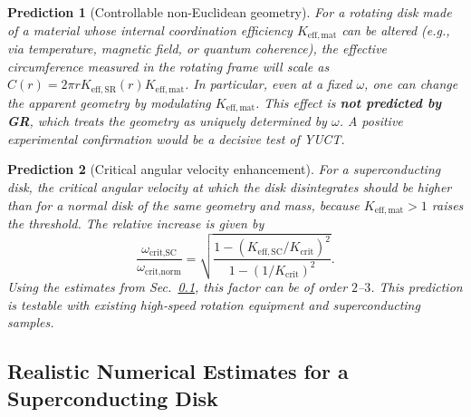 \documentclass[12pt,a4paper]{article}
\newtheorem{prediction}{Prediction}[section]
\begin{document}
	\begin{prediction}[Controllable non-Euclidean geometry]
		For a rotating disk made of a material whose internal coordination efficiency \(K_{\mathrm{eff,mat}}\) can be altered (e.g., via temperature, magnetic field, or quantum coherence), the effective circumference measured in the rotating frame will scale as \(C(r) = 2\pi r K_{\mathrm{eff,SR}}(r) K_{\mathrm{eff,mat}}\). In particular, even at a fixed \(\omega\), one can change the apparent geometry by modulating \(K_{\mathrm{eff,mat}}\). This effect is \textbf{not predicted by GR}, which treats the geometry as uniquely determined by \(\omega\). A positive experimental confirmation would be a decisive test of YUCT.
	\end{prediction}
	
	\begin{prediction}[Critical angular velocity enhancement]
		For a superconducting disk, the critical angular velocity at which the disk disintegrates should be higher than for a normal disk of the same geometry and mass, because \(K_{\mathrm{eff,mat}} > 1\) raises the threshold. The relative increase is given by
		\[
		\frac{\omega_{\text{crit,SC}}}{\omega_{\text{crit,norm}}} = \sqrt{ \frac{1 - (K_{\mathrm{eff,SC}}/K_{\mathrm{crit}})^2}{1 - (1/K_{\mathrm{crit}})^2} }.
		\]
		Using the estimates from Sec.~\ref{subsec:numerical}, this factor can be of order \(2\)–\(3\). This prediction is testable with existing high‑speed rotation equipment and superconducting samples.
	\end{prediction}
	
	\subsection{Realistic Numerical Estimates for a Superconducting Disk}
	\label{subsec:numerical}
	
\end{document}
